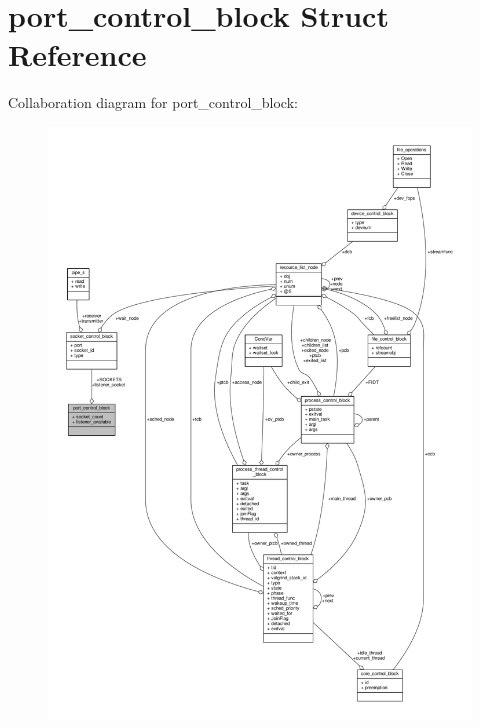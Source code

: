 \hypertarget{structport__control__block}{}\section{port\+\_\+control\+\_\+block Struct Reference}
\label{structport__control__block}


Collaboration diagram for port\+\_\+control\+\_\+block\+:
\nopagebreak
\begin{figure}[H]
\begin{center}
\leavevmode
\includegraphics[width=350pt]{structport__control__block__coll__graph}
\end{center}
\end{figure}
